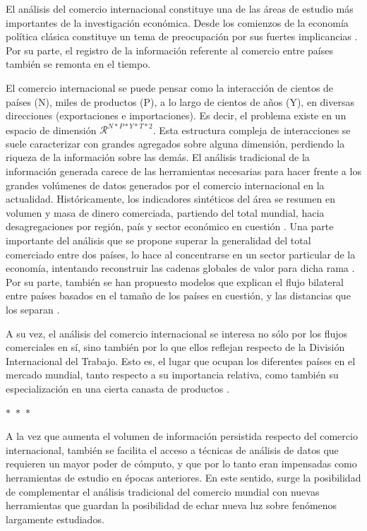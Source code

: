\documentclass[runningheads,a4paper]{llncs}
\begin{document}
El análisis del comercio internacional constituye una de las áreas de estudio más importantes de la investigación económica. Desde los comienzos de la economía política clásica constituye un tema de preocupación por sus fuertes implicancias \citep{ricardo1987principios}. Por su parte, el registro de la información referente al comercio entre países también se remonta en el tiempo.          

El comercio internacional se puede pensar como la interacción de cientos de países (N), miles de productos (P), a lo largo de cientos de años (Y), en diversas direcciones (exportaciones e importaciones). Es decir, el problema existe en un espacio de dimensión $\mathcal{R}^{N*P*Y*T*2}$. Esta estructura compleja de interacciones se suele caracterizar con grandes agregados sobre alguna dimensión, perdiendo la riqueza de la información sobre las demás. 
El análisis tradicional de la información generada carece de las herramientas necesarias para hacer frente a los grandes volúmenes de datos generados por el comercio internacional en la actualidad. Históricamente, los indicadores sintéticos del área se resumen en volumen y masa de dinero comerciada, partiendo del total mundial, hacia desagregaciones por región, país y sector económico en cuestión \citep{WTO2017}. Una parte importante del análisis que se propone superar la generalidad del total comerciado entre dos países, lo hace al concentrarse en un sector particular de la economía, intentando reconstruir las cadenas globales de valor para dicha rama \citep{giuliani2005upgrading}. Por su parte, también se han propuesto modelos que explican el flujo bilateral entre países basados en el tamaño de los países en cuestión, y las distancias que los separan \citep{Head2014}. 

A su vez, el análisis del comercio internacional se interesa no sólo por los flujos comerciales en sí, sino también por lo que ellos reflejan respecto de la División Internacional del Trabajo. Esto es, el lugar que ocupan los diferentes países en el mercado mundial, tanto respecto a su importancia relativa, como también su especialización en una cierta canasta de productos \citep{frobel1978new}.  \\


\begin{center}
	$\ast$~$\ast$~$\ast$
\end{center}

A la vez que aumenta el volumen de información persistida respecto del comercio internacional, también se facilita el acceso a técnicas de análisis de datos que requieren un mayor poder de cómputo, y que por lo tanto eran impensadas como herramientas de estudio en épocas anteriores.  En este sentido, surge la posibilidad de complementar el análisis tradicional del comercio mundial con nuevas herramientas que guardan la posibilidad de echar nueva luz sobre fenómenos largamente estudiados. 
\end{document}
